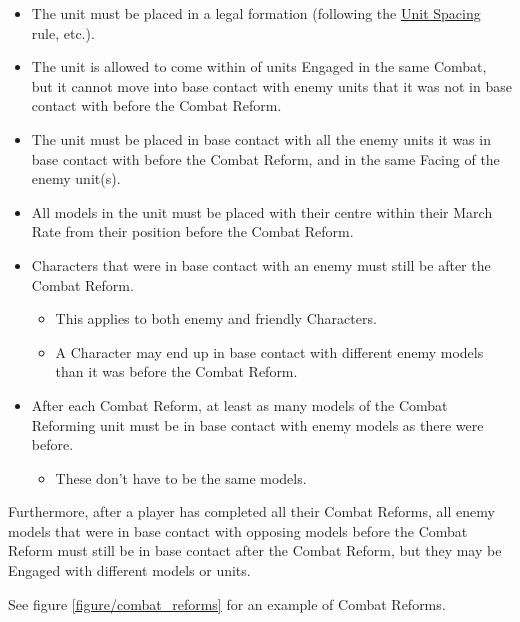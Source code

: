 \begin{itemize}
	\item The unit must be placed in a legal formation (following the \hyperref[unit_spacing]{Unit Spacing} rule, etc.).
	\item The unit is allowed to come within  of units Engaged in the same Combat, but it cannot move into base contact with enemy units that it was not in base contact with before the Combat Reform.
	\item The unit must be placed in base contact with all the enemy units it was in base contact with before the Combat Reform, and in the same Facing of the enemy unit(s).
	\item All models in the unit must be placed with their centre within their March Rate from their position before the Combat Reform.
	\item Characters that were in base contact with an enemy must still be after the Combat Reform.
	\begin{itemize}
		\item This applies to both enemy and friendly Characters.
		\item A Character may end up in base contact with different enemy models than it was before the Combat Reform.
	\end{itemize}
	\item After each Combat Reform, at least as many models of the Combat Reforming unit must be in base contact with enemy models as there were before.
	\begin{itemize}
		\item These don't have to be the same models.
	\end{itemize}
\end{itemize}

Furthermore, after a player has completed all their Combat Reforms, all enemy models that were in base contact with opposing models before the Combat Reform must still be in base contact after the Combat Reform, but they may be Engaged with different models or units.

See figure \ref{figure/combat_reforms} for an example of Combat Reforms.

\RBemc
